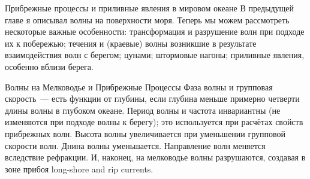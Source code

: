 
\begin{chapter}{Прибрежные процессы и приливные явления в мировом океане}\label{chap:17}
В предыдущей главе я описывал волны на поверхности моря. Теперь мы
можем рассмотреть нескоторые важные особенности: трансформация и
разрушение волн при подходе их к побережью; течения и (краевые) волны
возникшие в результате взаимодействия волн с берегом; цунами;
штормовые нагоны; приливные явления, особенно вблизи берега.
%

\begin{section}{Волны на Мелководье и Прибрежные Процессы}
Фаза волны и групповая скорость~--- есть функции от глубины, если
глубина меньше примерно четверти длины волны в глубоком океане. Период
волны и частота инвариантны (не изменяются при подходе волны к
берегу); это используется при расчётах свойств прибрежных волн. Высота
волны увеличивается при уменьшении групповой скорости волн. Днина
волны уменьшается. Направление волн меняется вследствие рефракции. И,
наконец, на мелководье волны разрушаются, создавая в зоне прибоя
long-shore and rip currents.
%


\end{section}
\end{chapter}
